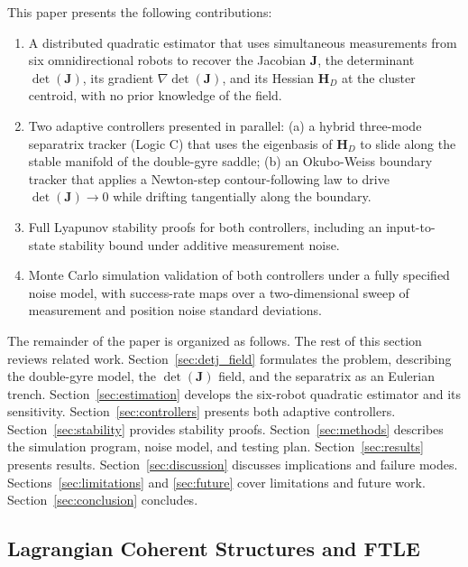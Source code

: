 \documentclass[lettersize,journal]{IEEEtran}
\begin{document}
This paper presents the following contributions:
\begin{enumerate}
    \item A distributed quadratic estimator that uses simultaneous measurements
          from six omnidirectional robots to recover the Jacobian $\mathbf{J}$,
          the determinant $\det(\mathbf{J})$, its gradient
          $\nabla\det(\mathbf{J})$, and its Hessian $\mathbf{H}_D$ at the cluster
          centroid, with no prior knowledge of the field.
    \item Two adaptive controllers presented in parallel: (a) a hybrid three-mode
          separatrix tracker (Logic C) that uses the eigenbasis of
          $\mathbf{H}_D$ to slide along the stable manifold of the double-gyre
          saddle; (b) an Okubo-Weiss boundary tracker that applies a Newton-step
          contour-following law to drive $\det(\mathbf{J}) \to 0$ while drifting
          tangentially along the boundary.
    \item Full Lyapunov stability proofs for both controllers, including an
          input-to-state stability bound under additive measurement noise.
    \item Monte Carlo simulation validation of both controllers under a fully
          specified noise model, with success-rate maps over a two-dimensional
          sweep of measurement and position noise standard deviations.
\end{enumerate}

The remainder of the paper is organized as follows. The rest of this
section reviews related work. Section~\ref{sec:detj_field} formulates the
problem, describing the double-gyre model, the $\det(\mathbf{J})$ field, and
the separatrix as an Eulerian trench.
Section~\ref{sec:estimation} develops the six-robot quadratic estimator
and its sensitivity. Section~\ref{sec:controllers} presents both adaptive
controllers.
Section~\ref{sec:stability} provides stability proofs.
Section~\ref{sec:methods} describes the simulation program, noise model, and
testing plan. Section~\ref{sec:results} presents results.
Section~\ref{sec:discussion} discusses implications and failure modes.
Sections~\ref{sec:limitations} and \ref{sec:future} cover limitations and
future work. Section~\ref{sec:conclusion} concludes.



\subsection{Lagrangian Coherent Structures and FTLE}
\end{document}
